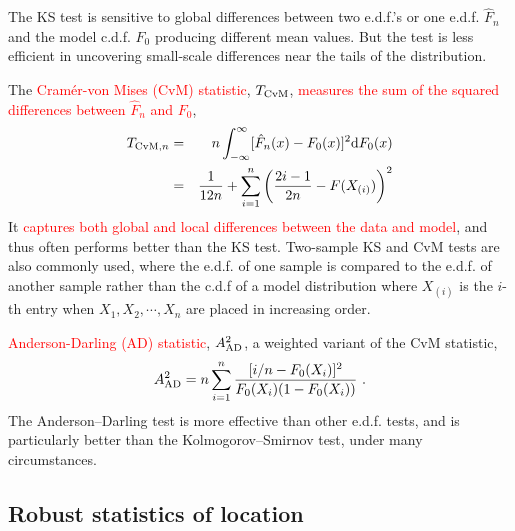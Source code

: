 \documentclass[12pt,a4paper]{article}
\newcommand{\dif}{\mathrm{d}}
\begin{document}
The KS test is sensitive to global differences between two e.d.f.’s or one e.d.f. $\hat{F}_n$ and the model c.d.f. $F_0$ producing different mean values. But the test is less efficient in uncovering small-scale differences near the tails of the distribution.

The \textcolor{red}{Cram\'{e}r-von Mises (CvM) statistic}, \textcolor{red}{$T_{\rm CvM}$}, \textcolor{red}{measures the sum of the squared differences between $\hat{F}_n$ and $F_0$},
\begin{eqnarray}
\nonumber T_{{\rm CvM},n} &=& n\int_{-\infty}^\infty [\hat{F}_n(x) -F_0(x)]^2 \dif F_0(x) \\
&=& \frac{1}{12 n} + \sum_{i=1}^n \left(\frac{2i-1}{2n} -F(X_{(i)}) \right)^2
\end{eqnarray}
It \textcolor{red}{captures both global and local differences between the data and model}, and thus often performs better than the KS test. Two-sample KS and CvM tests are also commonly used, where the e.d.f. of one sample is compared to the e.d.f. of another sample rather than the c.d.f of a model distribution where $X_{(i)}$ is the $i$-th entry when $X_1, X_2, \cdots, X_n$ are placed in increasing order.

\textcolor{red}{Anderson-Darling (AD) statistic}, \textcolor{red}{$A^2_{\rm AD}$}, a weighted variant of the CvM statistic,
\begin{equation}
A^2_{\rm AD} = n \sum_{i=1}^n \frac{[i/n -F_0(X_i)]^2}{F_0(X_i)(1-F_0(X_i))} ~.
\end{equation}
The Anderson–Darling test is more effective than other e.d.f. tests, and is particularly better than the Kolmogorov–Smirnov test, under many circumstances. 

\subsection{Robust statistics of location}
\end{document}

